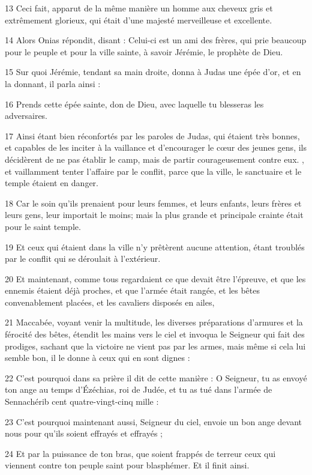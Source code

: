 \par 13 Ceci fait, apparut de la même manière un homme aux cheveux gris et extrêmement glorieux, qui était d'une majesté merveilleuse et excellente.
\par 14 Alors Onias répondit, disant : Celui-ci est un ami des frères, qui prie beaucoup pour le peuple et pour la ville sainte, à savoir Jérémie, le prophète de Dieu.
\par 15 Sur quoi Jérémie, tendant sa main droite, donna à Judas une épée d'or, et en la donnant, il parla ainsi :
\par 16 Prends cette épée sainte, don de Dieu, avec laquelle tu blesseras les adversaires.
\par 17 Ainsi étant bien réconfortés par les paroles de Judas, qui étaient très bonnes, et capables de les inciter à la vaillance et d'encourager le cœur des jeunes gens, ils décidèrent de ne pas établir le camp, mais de partir courageusement contre eux. , et vaillamment tenter l'affaire par le conflit, parce que la ville, le sanctuaire et le temple étaient en danger.
\par 18 Car le soin qu'ils prenaient pour leurs femmes, et leurs enfants, leurs frères et leurs gens, leur importait le moins; mais la plus grande et principale crainte était pour le saint temple.
\par 19 Et ceux qui étaient dans la ville n'y prêtèrent aucune attention, étant troublés par le conflit qui se déroulait à l'extérieur.
\par 20 Et maintenant, comme tous regardaient ce que devait être l'épreuve, et que les ennemis étaient déjà proches, et que l'armée était rangée, et les bêtes convenablement placées, et les cavaliers disposés en ailes,
\par 21 Maccabée, voyant venir la multitude, les diverses préparations d'armures et la férocité des bêtes, étendit les mains vers le ciel et invoqua le Seigneur qui fait des prodiges, sachant que la victoire ne vient pas par les armes, mais même si cela lui semble bon, il le donne à ceux qui en sont dignes :
\par 22 C'est pourquoi dans sa prière il dit de cette manière : O Seigneur, tu as envoyé ton ange au temps d'Ézéchias, roi de Judée, et tu as tué dans l'armée de Sennachérib cent quatre-vingt-cinq mille :
\par 23 C'est pourquoi maintenant aussi, Seigneur du ciel, envoie un bon ange devant nous pour qu'ils soient effrayés et effrayés ;
\par 24 Et par la puissance de ton bras, que soient frappés de terreur ceux qui viennent contre ton peuple saint pour blasphémer. Et il finit ainsi.

